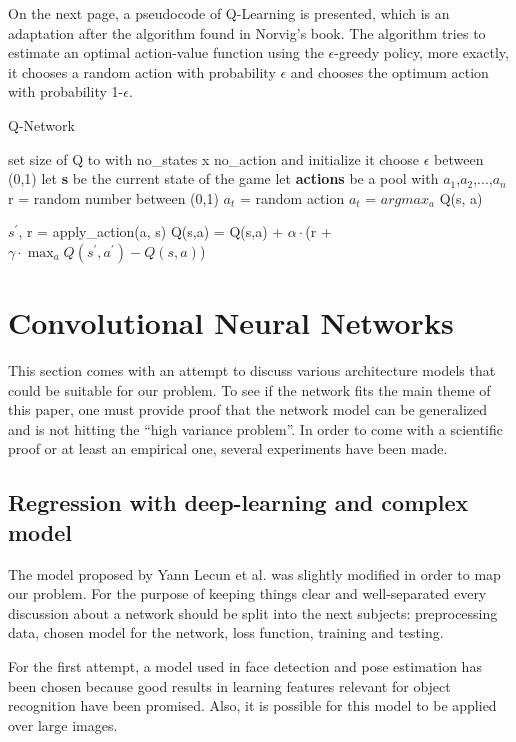 On the next page, a pseudocode of Q-Learning is presented, which is an adaptation after the algorithm found in Norvig's book{\cite{norvig}}. The algorithm tries to estimate an optimal action-value function using the $\epsilon$-greedy policy, more exactly, it chooses a random action with probability $\epsilon$ and chooses the optimum action with probability 1-$\epsilon$.
\newpage
\begin{algorithm}
	\caption{Q-Network} \label{alg-code}
	\begin{algorithmic}[1]
		\State set size of Q to with no_states x no_action and initialize it
		\State choose $\epsilon$ between (0,1)
		\State let \textbf{s} be the current state of the game
		\State let \textbf{actions} be a pool with {$a_1$,$a_2$,...,$a_n$}
			\State r = random number between (0,1)
				\State $a_t$ = random action
			\Else
				\State $a_t$ = $argmax_a$ Q(s, a)
			\EndIf
			
			\State $s^\prime$, r = apply_action(a, s)
			\State Q(s,a) = Q(s,a) + $\alpha\cdot$(r + $\gamma\cdot \max_a Q(s^\prime,a^\prime)-Q(s,a)$)
		\EndWhile
	\end{algorithmic}
\end{algorithm}

\section{Convolutional Neural Networks}
This section comes with an attempt to discuss various architecture models that could be suitable for our problem. To see if the network fits the main theme of this paper, one must provide proof that the network model can be generalized and is not hitting the ``high variance problem''. In order to come with a scientific proof or at least an empirical one, several experiments have been made.

\subsection{Regression with deep-learning and complex model}
The model proposed by Yann Lecun et al.\cite{energy-based} was slightly modified in order to map our problem. For the purpose of keeping things clear and well-separated every discussion about a network should be split into the next subjects: preprocessing data, chosen model for the network, loss function, training and testing.

For the first attempt, a model used in face detection and pose estimation has been chosen because good results in learning features relevant for object recognition have been promised. Also, it is possible for this model to be applied over large images.

